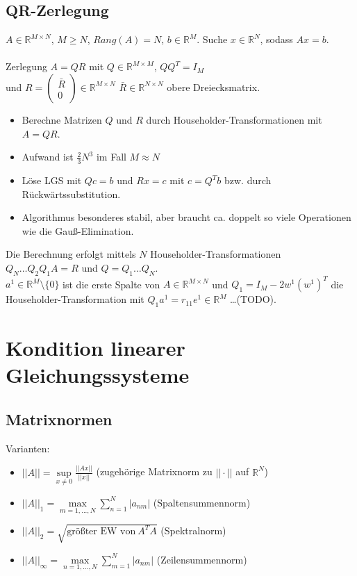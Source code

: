 \documentclass[a4paper]{article}
\newcommand{\set}[1]{\{ #1 \}}
\begin{document}
\subsection{QR-Zerlegung}

$ A \in \mathbb{R}^{M \times N} $, $M \ge N$, $Rang(A) = N$,
$b \in \mathbb{R}^M$.
Suche $ x \in \mathbb{R}^{N} $, sodass $Ax=b$.
\\
\\
Zerlegung $A = QR$ mit $Q \in \mathbb{R}^{M \times M}$, $QQ^T=I_M$
\\
\hspace{4em}
und $R = \begin{pmatrix}\bar{R}\\0\end{pmatrix} \in \mathbb{R}^{M \times N}$
$\bar{R} \in \mathbb{R}^{N \times N}$ obere Dreiecksmatrix. 

\begin{itemize}
    \item Berechne Matrizen $Q$ und $R$ durch
    Householder-Transformationen mit $A = QR$.
    \item Aufwand ist $\frac{2}{3} N^3$ im Fall $M \approx N$
    \item Löse LGS mit $Qc = b$ und $Rx = c$
    mit $c = Q^T b$ bzw. durch Rückwärtssubstitution.
    \item Algorithmus besonderes stabil, aber braucht ca. doppelt so viele
    Operationen wie die Gauß-Elimination.
\end{itemize}

Die Berechnung erfolgt mittels $N$ Householder-Transformationen
$Q_N \dots Q_2 Q_1A = R$ und $Q = Q_1 \dots Q_N$.
\\
$a^1 \in \mathbb{R}^M \setminus \set{0}$ ist die erste Spalte von
$A \in \mathbb{R}^{M \times N}$ und $Q_1 = I_M - 2w^1(w^1)^T$ die
Householder-Transformation mit $Q_1 a^1 = r_11 e^1 \in \mathbb{R}^M$
\dots (TODO).

\section{Kondition linearer Gleichungssysteme}

\subsection{Matrixnormen}

Varianten:
\begin{itemize}
    \item $||A|| = \sup\limits_{x \neq 0} \frac{||Ax||}{||x||}$
    (zugehörige Matrixnorm zu $||\cdot||$ auf $\mathbb{R}^N$)
    \item $||A||_1 = \max\limits_{m=1,...,N} \sum_{n=1}^N |a_{nm}|$
    (Spaltensummennorm)
    \item $||A||_2 = \sqrt{\textrm{größter EW von}~A^T A}$
    (Spektralnorm)
    \item $||A||_\infty = \max\limits_{n=1,...,N} \sum_{m=1}^N |a_{nm}|$
    (Zeilensummennorm)
\end{itemize}
\end{document}

